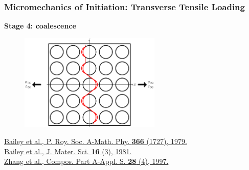 \documentclass[first,firstsupp,lastsupp,last,hyperref,table]{ETHclass}
\begin{document}
\begin{frame}
\frametitle{\vspace{0.2cm}\small Micromechanics of Initiation: Transverse Tensile Loading}
\vspace{-0.5cm}
\centering
\begin{alertblock}{\centering\scriptsize\bf Stage 4: coalescence}
\vspace{-0.25cm}
\begin{figure}
\centering
\includegraphics[width=0.6\textwidth]{stage4-coalescence.pdf}
\end{figure}
\end{alertblock}
\vspace{-0.5cm}
\pgfmathsetmacro{}
\pgfmathsetmacro{}
{\fontsize{\fontsizeref}{\stretchref} \selectfont \href{https://doi.org/10.1098/rspa.1979.0071}{Bailey et al., P. Roy. Soc. A-Math. Phy. \textbf{366} (1727), 1979.}}\\\vspace{-5pt}
{\fontsize{\fontsizeref}{\stretchref} \selectfont \href{https://doi.org/10.1007/BF00552203}{Bailey et al., J. Mater. Sci. \textbf{16} (3), 1981.}}\\\vspace{-5pt}
{\fontsize{\fontsizeref}{\stretchref} \selectfont \href{https://doi.org/10.1016/S1359-835X(96)00123-6}{Zhang et al., Compos. Part A-Appl. S. \textbf{28} (4), 1997.}}
\end{frame}
\end{document}
